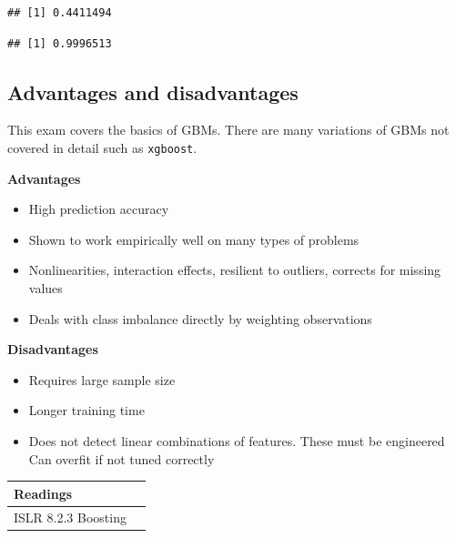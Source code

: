 \documentclass[openany]{book}
\newenvironment{Shaded}{\begin{snugshade}}{\end{snugshade}}
\newcommand{\KeywordTok}[1]{\textcolor[rgb]{0.13,0.29,0.53}{\textbf{#1}}}
\newcommand{\NormalTok}[1]{#1}
\newcommand{\OperatorTok}[1]{\textcolor[rgb]{0.81,0.36,0.00}{\textbf{#1}}}
\providecommand{\tightlist}{%
  \setlength{\itemsep}{0pt}\setlength{\parskip}{0pt}}
\begin{document}
\begin{verbatim}
## [1] 0.4411494
\end{verbatim}

\begin{Shaded}
\end{Shaded}

\begin{verbatim}
## [1] 0.9996513
\end{verbatim}

\hypertarget{advantages-and-disadvantages-4}{%
\subsection{Advantages and disadvantages}\label{advantages-and-disadvantages-4}}

This exam covers the basics of GBMs. There are many variations of GBMs not covered in detail such as \texttt{xgboost}.

\textbf{Advantages}

\begin{itemize}
\tightlist
\item
  High prediction accuracy
\item
  Shown to work empirically well on many types of problems
\item
  Nonlinearities, interaction effects, resilient to outliers, corrects for missing values
\item
  Deals with class imbalance directly by weighting observations
\end{itemize}

\textbf{Disadvantages}

\begin{itemize}
\tightlist
\item
  Requires large sample size
\item
  Longer training time
\item
  Does not detect linear combinations of features. These must be engineered
  Can overfit if not tuned correctly
\end{itemize}

\begin{longtable}[]{@{}ll@{}}
\toprule
Readings &\tabularnewline
\midrule
\endhead
ISLR 8.2.3 Boosting &\tabularnewline
\bottomrule
\end{longtable}
\end{document}
